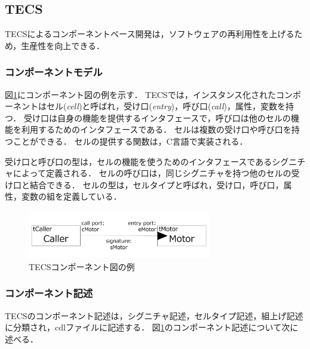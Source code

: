 \documentclass[submit,techrep]{ipsj}
\begin{document}
\subsection{TECS\cite{par:TECS}}
TECSによるコンポーネントベース開発は，ソフトウェアの再利用性を上げるため，生産性を向上できる．


\subsubsection{コンポーネントモデル}
図\ref{fig:component}にコンポーネント図の例を示す．
TECSでは，インスタンス化されたコンポーネントはセル({\it cell})と呼ばれ，受け口({\it entry})，呼び口({\it call})，属性，変数を持つ．
受け口は自身の機能を提供するインタフェースで，呼び口は他のセルの機能を利用するためのインタフェースである．
セルは複数の受け口や呼び口を持つことができる．
セルの提供する関数は，C言語で実装される．

受け口と呼び口の型は，セルの機能を使うためのインタフェースであるシグニチャによって定義される．
セルの呼び口は，同じシグニチャを持つ他のセルの受け口と結合できる．
セルの型は，セルタイプと呼ばれ，受け口，呼び口，属性，変数の組を定義している．

\begin{figure}[t]
    \centering
    \includegraphics[width=8cm,clip]{../EMSOFT2016/figure/component_diagram.pdf}
    \vspace{-4mm}
    \caption{TECSコンポーネント図の例}
    \vspace{-5mm}
    \label{fig:component}
\end{figure}

\subsubsection{コンポーネント記述}
TECSのコンポーネント記述は，シグニチャ記述，セルタイプ記述，組上げ記述に分類され，cdlファイルに記述する．
図\ref{fig:component}のコンポーネント記述について次に述べる．
\end{document}
